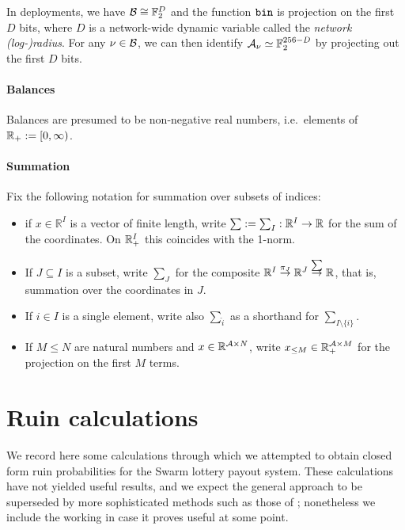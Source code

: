In deployments, we have $\mathcal{B}\cong \mathbb{F}_2^D$ and the function $\mathtt{bin}$ is projection on the first $D$ bits, where $D$ is a network-wide dynamic variable called the \emph{network (log-)radius}.
%
For any $\nu\in\mathcal{B}$, we can then identify $\mathcal{A}_\nu\simeq\mathbb{F}_2^{256-D}$ by projecting out the first $D$ bits.


\paragraph{Balances} Balances are presumed to be non-negative real numbers, i.e.~elements of $\mathbb{R}_+ := [0,\infty)$.

\paragraph{Summation}
Fix the following notation for summation over subsets of indices:
\begin{itemize}
  \item if $x\in \mathbb{R}^I$ is a vector of finite length, write $\sum:=\sum_I:\mathbb{R}^I\rightarrow\mathbb{R}$ for the sum of the coordinates. On $\mathbb{R}_+^I$ this coincides with the 1-norm.
  \item If $J\subseteq I$ is a subset, write $\sum_J$ for the composite $\mathbb{R}^I\stackrel{\pi_J}{\rightarrow}\mathbb{R}^J\stackrel{\sum}{\rightarrow}\mathbb{R}$, that is, summation over the coordinates in $J$.
  \item If $i\in I$ is a single element, write also $\sum_{\hat{i}}$ as a shorthand for $\sum_{I\setminus\{i\}}$.
  \item If $M\leq N$ are natural numbers and $x\in\mathbb{R}^{\mathcal{A}\times N}$, write $x_{\leq M}\in \mathbb{R}_+^{\mathcal{A}\times M}$ for the projection on the first $M$ terms.
\end{itemize}


\section{Ruin calculations}
\label{section:ruin-calculations}

We record here some calculations through which we attempted to obtain closed form ruin probabilities for the Swarm lottery payout system.
%
These calculations have not yielded useful results, and we expect the general approach to be superseded by more sophisticated methods such as those of \cite{asmussen2010ruin,albrecher2022blockchain}; nonetheless we include the working in case it proves useful at some point.

